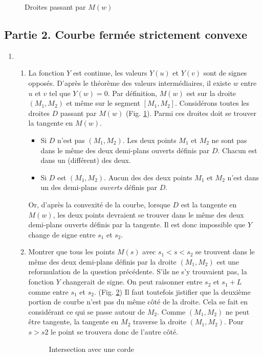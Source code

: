 \begin{figure}[h!t]
 \centering
 
 \caption{Droites passant par $M(w)$}
 \label{fig:Csommets_1}
\end{figure}

\subsection*{Partie 2. Courbe fermée strictement convexe}
\begin{enumerate}
 \item 
\begin{enumerate}
 \item La fonction $Y$ est continue, les valeurs $Y(u)$ et $Y(v)$ sont de signes opposés. D'après le théorème des valeurs intermédiaires, il existe $w$ entre $u$ et $v$ tel que $Y(w)=0$.\newline
Par définition, $M(w)$ est sur la droite $(M_1,M_2)$ et même sur le segment $[M_1,M_2]$. Considérons toutes les droites $D$ passant par $M(w)$ (Fig. \ref{fig:Csommets_1}). Parmi  ces droites doit se trouver la tangente en $M(w)$.
\begin{itemize}
 \item Si $D$ n'est pas $(M_1,M_2)$. Les deux points $M_1$ et $M_2$ ne sont pas dans le même des deux demi-plans ouverts définis par $D$. Chacun est dans un (différent) des deux.
\item Si $D$ est  $(M_1,M_2)$. Aucun des des deux points $M_1$ et $M_2$ n'est dans un des demi-plans \emph{ouverts} définis par $D$.
\end{itemize}
Or, d'après la convexité de la courbe, lorsque $D$ est la tangente en $M(w)$, les deux points devraient se trouver dans le même des deux demi-plans ouverts définis par la tangente. Il est donc impossible que $Y$ change de signe entre $s_1$ et $s_2$.
\item Montrer que tous les points $M(s)$ avec $s_1<s<s_2$ se trouvent dans le même des deux demi-plans définis par la droite $(M_1,M_2)$ est une reformulation de la question précédente. S'ils ne s'y trouvaient pas, la fonction $Y$ changerait de signe.\newline
On peut raisonner entre $s_2$ et $s_1+L$ comme entre $s_1$ et $s_2$. (Fig. \ref{fig:Csommets_2}) Il faut toutefois jistifier que la deuxième portion de courbe n'est pas du même côté de la droite. Cela se fait en considérant ce qui se passe autour de $M_2$. Comme $(M_1,M_2)$ ne peut être tangente, la tangente en $M_2$ traverse la droite $(M_1,M_2)$. Pour $s>s2$ le point se trouvera donc de l'autre côté.
\begin{figure}[ht]
 \centering
 
 \caption{Intersection avec une corde}
 \label{fig:Csommets_2}
\end{figure}
\end{enumerate}


\end{enumerate}
